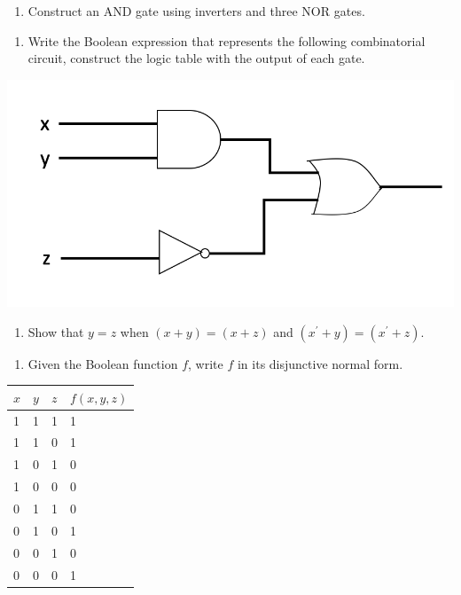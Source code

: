 \documentclass[]{book}
\providecommand{\tightlist}{%
  \setlength{\itemsep}{0pt}\setlength{\parskip}{0pt}}
\begin{document}
\begin{enumerate}
\def\labelenumi{\arabic{enumi}.}
\setcounter{enumi}{7}
\tightlist
\item
  Construct an AND gate using inverters and three NOR gates.
\end{enumerate}

\newpage

\begin{enumerate}
\def\labelenumi{\arabic{enumi}.}
\setcounter{enumi}{8}
\tightlist
\item
  Write the Boolean expression that represents the following combinatorial circuit, construct the logic table with the output of each gate.
\end{enumerate}

\begin{center}\includegraphics[width=1\linewidth]{figure/networkQ9} \end{center}

\begin{enumerate}
\def\labelenumi{\arabic{enumi}.}
\setcounter{enumi}{9}
\tightlist
\item
  Show that \(y=z\) when \((x+y)=(x+z)\) and \((x^\prime+y)=(x^\prime+z)\).
\end{enumerate}

\begin{enumerate}
\def\labelenumi{\arabic{enumi}.}
\setcounter{enumi}{10}
\tightlist
\item
  Given the Boolean function \(f\), write \(f\) in its disjunctive normal form.
\end{enumerate}

\begin{longtable}[]{@{}llll@{}}
\toprule
\(x\) & \(y\) & \(z\) & \(f(x,y,z)\)\tabularnewline
\midrule
\endhead
1 & 1 & 1 & 1\tabularnewline
1 & 1 & 0 & 1\tabularnewline
1 & 0 & 1 & 0\tabularnewline
1 & 0 & 0 & 0\tabularnewline
0 & 1 & 1 & 0\tabularnewline
0 & 1 & 0 & 1\tabularnewline
0 & 0 & 1 & 0\tabularnewline
0 & 0 & 0 & 1\tabularnewline
\bottomrule
\end{longtable}
\end{document}
